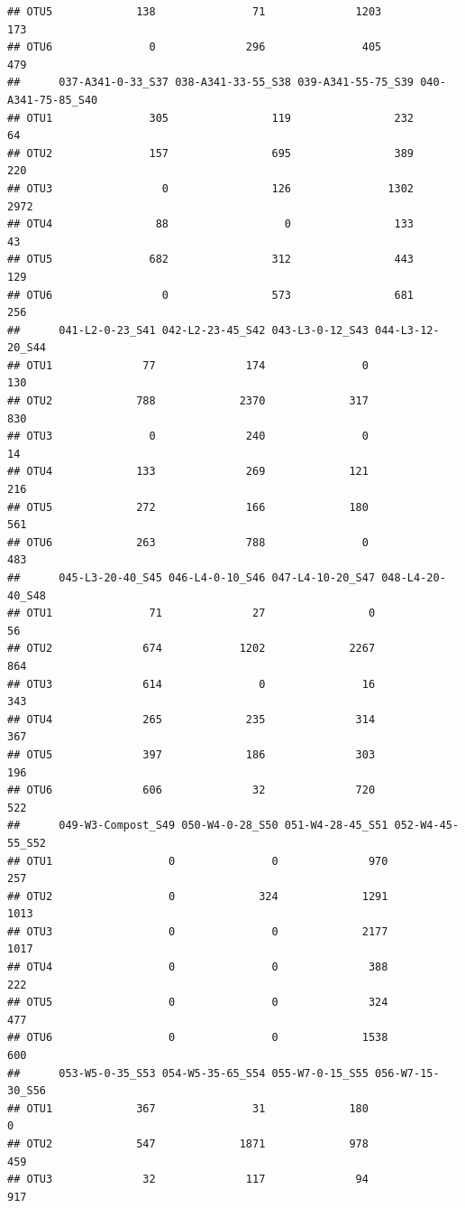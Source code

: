 \documentclass[]{article}
\begin{document}
\begin{verbatim}
## OTU5             138               71              1203                173
## OTU6               0              296               405                479
##      037-A341-0-33_S37 038-A341-33-55_S38 039-A341-55-75_S39 040-A341-75-85_S40
## OTU1               305                119                232                 64
## OTU2               157                695                389                220
## OTU3                 0                126               1302               2972
## OTU4                88                  0                133                 43
## OTU5               682                312                443                129
## OTU6                 0                573                681                256
##      041-L2-0-23_S41 042-L2-23-45_S42 043-L3-0-12_S43 044-L3-12-20_S44
## OTU1              77              174               0              130
## OTU2             788             2370             317              830
## OTU3               0              240               0               14
## OTU4             133              269             121              216
## OTU5             272              166             180              561
## OTU6             263              788               0              483
##      045-L3-20-40_S45 046-L4-0-10_S46 047-L4-10-20_S47 048-L4-20-40_S48
## OTU1               71              27                0               56
## OTU2              674            1202             2267              864
## OTU3              614               0               16              343
## OTU4              265             235              314              367
## OTU5              397             186              303              196
## OTU6              606              32              720              522
##      049-W3-Compost_S49 050-W4-0-28_S50 051-W4-28-45_S51 052-W4-45-55_S52
## OTU1                  0               0              970              257
## OTU2                  0             324             1291             1013
## OTU3                  0               0             2177             1017
## OTU4                  0               0              388              222
## OTU5                  0               0              324              477
## OTU6                  0               0             1538              600
##      053-W5-0-35_S53 054-W5-35-65_S54 055-W7-0-15_S55 056-W7-15-30_S56
## OTU1             367               31             180                0
## OTU2             547             1871             978              459
## OTU3              32              117              94              917

\end{verbatim}
\end{document}
